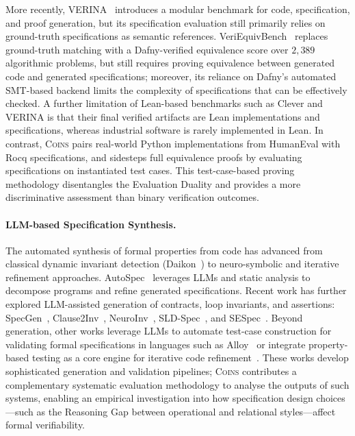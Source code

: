 \documentclass{article}
\theoremstyle{plain}
\theoremstyle{definition}
\theoremstyle{remark}
\begin{document}
More recently, VERINA~\cite{ye2026verina} introduces a modular benchmark for code, specification, and proof generation, but its specification evaluation still primarily relies on ground-truth specifications as semantic references. VeriEquivBench~\cite{zeng2026veriequivbench} replaces ground-truth matching with a Dafny-verified equivalence score over $2{,}389$ algorithmic problems, but still requires proving equivalence between generated code and generated specifications; moreover, its reliance on Dafny's automated SMT-based backend limits the complexity of specifications that can be effectively checked. A further limitation of Lean-based benchmarks such as Clever and VERINA is that their final verified artifacts are Lean implementations and specifications, whereas industrial software is rarely implemented in Lean. In contrast, \textsc{Coins} pairs real-world Python implementations from HumanEval with Rocq specifications, and sidesteps full equivalence proofs by evaluating specifications on instantiated test cases. This test-case-based proving methodology disentangles the Evaluation Duality and provides a more discriminative assessment than binary verification outcomes.

\paragraph{LLM-based Specification Synthesis.}
The automated synthesis of formal properties from code has advanced from classical dynamic invariant detection (Daikon~\cite{Daikon}) to neuro-symbolic and iterative refinement approaches. AutoSpec~\cite{autospec} leverages LLMs and static analysis to decompose programs and refine generated specifications. Recent work has further explored LLM-assisted generation of contracts, loop invariants, and assertions: SpecGen~\cite{ma2025specgen}, Clause2Inv~\cite{cao2025clause2inv}, NeuroInv~\cite{king2025neurosymbolic}, SLD-Spec~\cite{chen2025sldspec}, and SESpec~\cite{yang2026integratingsymbolicexecutionllms}. Beyond generation, other works leverage LLMs to automate test-case construction for validating formal specifications in languages such as Alloy~\cite{cunha2025validating} or integrate property-based testing as a core engine for iterative code refinement~\cite{he2025pgs}. These works develop sophisticated generation and validation pipelines; \textsc{Coins} contributes a complementary systematic evaluation methodology to analyse the outputs of such systems, enabling an empirical investigation into how specification design choices---such as the Reasoning Gap between operational and relational styles---affect formal verifiability.
\end{document}
